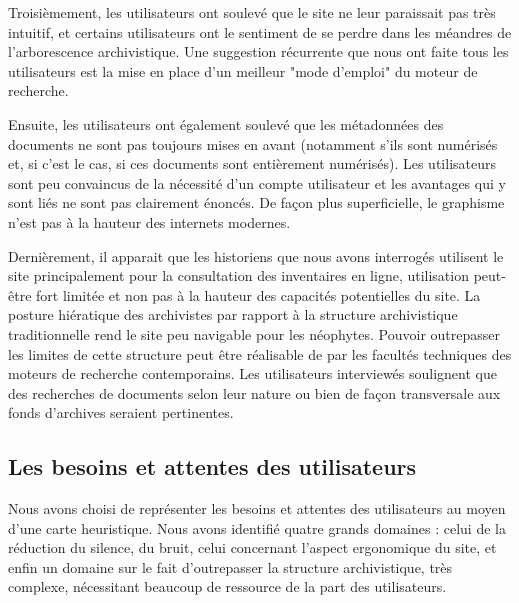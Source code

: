 \documentclass[a4paper,12pt]{article}
\begin{document}
Troisièmement, les utilisateurs ont soulevé que le site ne leur paraissait pas très intuitif, et certains utilisateurs ont le sentiment de se perdre dans les méandres de l'arborescence archivistique. Une suggestion récurrente que nous ont faite tous les utilisateurs est la mise en place d'un meilleur "mode d'emploi" du moteur de recherche.

Ensuite, les utilisateurs ont également soulevé que les métadonnées des documents ne sont pas toujours mises en avant (notamment s’ils sont numérisés et, si c’est le cas, si ces documents sont entièrement numérisés). 
Les utilisateurs sont peu convaincus de la nécessité d’un compte utilisateur et les avantages qui y sont liés ne sont pas clairement énoncés. 
De façon plus superficielle, le graphisme n’est pas à la hauteur des internets modernes. 

Dernièrement, il apparait que les historiens que nous avons interrogés utilisent le site principalement pour la consultation des inventaires en ligne, utilisation peut-être fort limitée et non pas à la hauteur des capacités potentielles du site.
La posture hiératique des archivistes par rapport à la structure archivistique traditionnelle rend le site peu navigable pour les néophytes. Pouvoir outrepasser les limites de cette structure peut être réalisable de par les facultés techniques des moteurs de recherche contemporains. Les utilisateurs interviewés soulignent que des recherches de documents selon leur nature ou bien de façon transversale aux fonds d’archives seraient pertinentes.

\subsection{Les besoins et attentes des utilisateurs}
Nous avons choisi de représenter les besoins et attentes des utilisateurs au moyen d'une carte heuristique. Nous avons identifié quatre grands domaines : celui de la réduction du silence, du bruit, celui concernant l'aspect ergonomique du site, et enfin un domaine sur le fait d'outrepasser la structure archivistique, très complexe, nécessitant beaucoup de ressource de la part des utilisateurs. 
\end{document}
